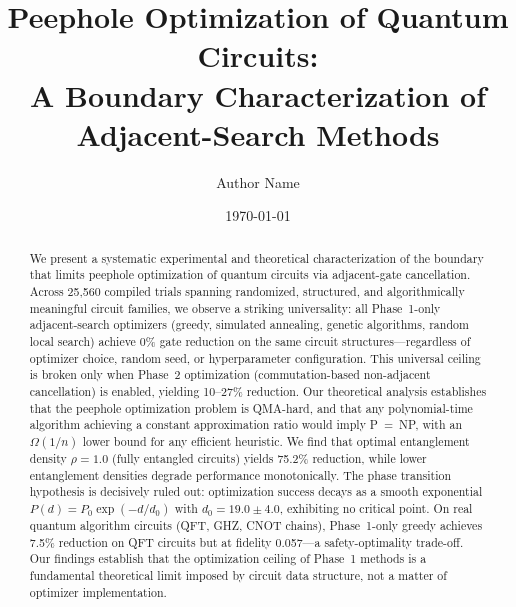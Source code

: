 \documentclass[aps,preprint,secnum,lined]{revtex4-2}
\begin{document}
\title{Peephole Optimization of Quantum Circuits:\\A Boundary Characterization of Adjacent-Search Methods}

\author{Author Name}

\date{\today}

\begin{abstract}
We present a systematic experimental and theoretical characterization of the boundary that limits peephole optimization of quantum circuits via adjacent-gate cancellation. Across 25,560 compiled trials spanning randomized, structured, and algorithmically meaningful circuit families, we observe a striking universality: all Phase~1-only adjacent-search optimizers (greedy, simulated annealing, genetic algorithms, random local search) achieve 0\% gate reduction on the same circuit structures---regardless of optimizer choice, random seed, or hyperparameter configuration. This universal ceiling is broken only when Phase~2 optimization (commutation-based non-adjacent cancellation) is enabled, yielding 10--27\% reduction. Our theoretical analysis establishes that the peephole optimization problem is QMA-hard, and that any polynomial-time algorithm achieving a constant approximation ratio would imply P~=~NP, with an $\Omega(1/n)$ lower bound for any efficient heuristic. We find that optimal entanglement density $\rho=1.0$ (fully entangled circuits) yields 75.2\% reduction, while lower entanglement densities degrade performance monotonically. The phase transition hypothesis is decisively ruled out: optimization success decays as a smooth exponential $P(d) = P_0 \exp(-d/d_0)$ with $d_0 = 19.0 \pm 4.0$, exhibiting no critical point. On real quantum algorithm circuits (QFT, GHZ, CNOT chains), Phase~1-only greedy achieves 7.5\% reduction on QFT circuits but at fidelity 0.057---a safety-optimality trade-off. Our findings establish that the optimization ceiling of Phase~1 methods is a fundamental theoretical limit imposed by circuit data structure, not a matter of optimizer implementation.
\end{abstract}


\maketitle

\end{document}
